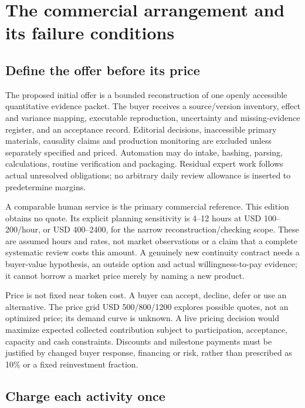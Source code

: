 \section{The commercial arrangement and its failure conditions}

\subsection{Define the offer before its price}

The proposed initial offer is a bounded reconstruction of one openly accessible quantitative evidence packet. The buyer receives a source/version inventory, effect and variance mapping, executable reproduction, uncertainty and missing-evidence register, and an acceptance record. Editorial decisions, inaccessible primary materials, causality claims and production monitoring are excluded unless separately specified and priced. Automation may do intake, hashing, parsing, calculations, routine verification and packaging. Residual expert work follows actual unresolved obligations; no arbitrary daily review allowance is inserted to predetermine margins.

A comparable human service is the primary commercial reference. This edition obtains no quote. Its explicit planning sensitivity is 4–12 hours at USD 100–200/hour, or USD 400–2400, for the narrow reconstruction/checking scope. These are assumed hours and rates, not market observations or a claim that a complete systematic review costs this amount. A genuinely new continuity contract needs a buyer-value hypothesis, an outside option and actual willingness-to-pay evidence; it cannot borrow a market price merely by naming a new product.

Price is not fixed near token cost. A buyer can accept, decline, defer or use an alternative. The price grid USD 500/800/1200 explores possible quotes, not an optimized price; its demand curve is unknown. A live pricing decision would maximize expected collected contribution subject to participation, acceptance, capacity and cash constraints. Discounts and milestone payments must be justified by changed buyer response, financing or risk, rather than prescribed as 10\% or a fixed reinvestment fraction.

\subsection{Charge each activity once}

